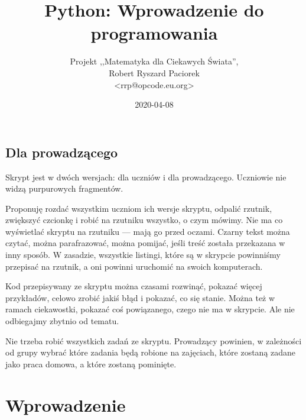 \documentclass{pdfBooklets}
\title{Python: Wprowadzenie do programowania}
\author{%
	Projekt ,,Matematyka dla Ciekawych Świata'',\\
	Robert Ryszard Paciorek\\\normalsize\ttfamily <rrp@opcode.eu.org>
}
\date  {2020-04-08}
\begin{document}
\maketitle

\begin{teacherOnly}
\section*{Dla prowadzącego}
Skrypt jest w dwóch wersjach: dla uczniów i dla prowadzącego.
Uczniowie nie widzą purpurowych fragmentów.

Proponuję rozdać wszystkim uczniom ich wersje skryptu, odpalić rzutnik, zwiększyć czcionkę i robić
na rzutniku wszystko, o czym mówimy. Nie ma co wyświetlać skryptu na rzutniku --- mają go przed oczami.
Czarny tekst można czytać, można parafrazować, można pomijać, jeśli treść została przekazana w inny sposób.
W zasadzie, wszystkie listingi, które są w skrypcie powinniśmy przepisać na rzutnik, a oni powinni
uruchomić na swoich komputerach.

Kod przepisywany ze skryptu można czasami rozwinąć, pokazać więcej przykładów, celowo zrobić jakiś błąd i pokazać, co się stanie.
Można też w ramach ciekawostki, pokazać coś powiązanego, czego nie ma w skrypcie.
Ale nie odbiegajmy zbytnio od tematu.

Nie trzeba robić wszystkich zadań ze skryptu. Prowadzący powinien, w zależności od grupy wybrać które zadania będą robione na zajęciach,
które zostaną zadane jako praca domowa, a które zostaną pominięte.
\end{teacherOnly}

\section{Wprowadzenie}
\end{document}
